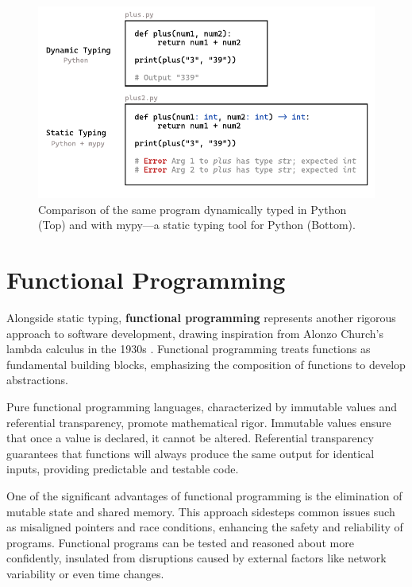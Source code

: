 \begin{figure}[hbt]
  \includegraphics[width=\linewidth]{TypedVsUntyped.pdf}
  \caption{
    \label{fig:typed-vs-untyped}
    Comparison of the same program dynamically typed in Python (Top) and with mypy—a static typing tool for Python (Bottom).
    }
\end{figure}



\section{Functional Programming}

Alongside static typing, \textbf{functional programming} represents another rigorous approach to software development, drawing inspiration from Alonzo Church's lambda calculus in the 1930s \cite{Church1985-bx}. Functional programming treats functions as fundamental building blocks, emphasizing the composition of functions to develop abstractions.

Pure functional programming languages, characterized by immutable values and referential transparency, promote mathematical rigor. Immutable values ensure that once a value is declared, it cannot be altered. Referential transparency guarantees that functions will always produce the same output for identical inputs, providing predictable and testable code.

One of the significant advantages of functional programming is the elimination of mutable state and shared memory. This approach sidesteps common issues such as misaligned pointers and race conditions, enhancing the safety and reliability of programs. Functional programs can be tested and reasoned about more confidently, insulated from disruptions caused by external factors like network variability or even time changes.

